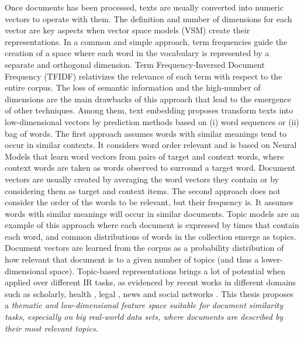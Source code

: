 Once documents has been processed, texts are usually converted into numeric vectors to operate with them. The definition and number of dimensions for each vector are key aspects when vector space models (VSM) create their representations. In a common and simple approach, term frequencies guide the creation of a space where each word in the vocabulary is represented by a separate and orthogonal dimension. Term Frequency-Inversed Document Frequency (TFIDF) relativizes the relevance of each term with respect to the entire corpus. The loss of semantic information and the high-number of dimensions are the main drawbacks of this approach that lead to the emergence of other techniques. Among them, text embedding proposes transform texts into low-dimensional vectors by prediction methods based on (i) word sequences or (ii) bag of words. The first approach assumes words with similar meanings tend to occur in similar contexts. It considers word order relevant and is based on Neural Models that learn word vectors from pairs of target and context words, where context words are taken as words observed to surround a target word. Document vectors are usually created by averaging the word vectors they contain or by considering them as target and context items. The second approach does not consider the order of the words to be relevant, but their frequency is. It assumes words with similar meanings will occur in similar documents. Topic models are an example of this approach where each document is expressed by times that contain each word, and common distributions of words in the collection emerge as topics. Document vectors are learned from the corpus as a probability distribution of how relevant that document is to a given number of topics (and thus a lower-dimensional space). Topic-based representations brings a lot of potential when applied over different IR tasks, as evidenced by recent works in different domains such as scholarly\cite{Gatti2015}, health \cite{Lu2016} \cite{TapiNzali2017}, legal \cite{ONeill2017}\cite{Greene2016}, news \cite{He2017} and social networks \cite{Cheng2014a}. This thesis proposes a \textit{thematic and low-dimensional feature space suitable for document similarity tasks, especially on big real-world data sets, where documents are described by their most relevant topics}. 

